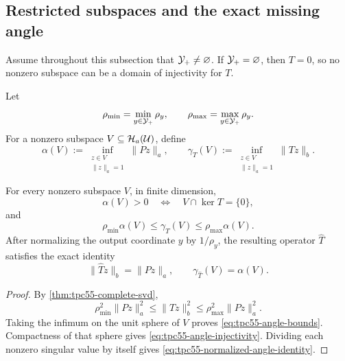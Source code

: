 \subsection{Restricted subspaces and the exact missing angle}

Assume throughout this subsection that \(\mathcal Y_+\ne\varnothing\).  If
\(\mathcal Y_+=\varnothing\), then \(T=0\), so no nonzero subspace can be a domain
of injectivity for \(T\).

Let
\begin{equation}
 \rho_{\min}=\min_{y\in\mathcal Y_+}\rho_y,
 \qquad
 \rho_{\max}=\max_{y\in\mathcal Y_+}\rho_y.
 \label{eq:tpc55-rho-extremes}
\end{equation}
For a nonzero subspace \(V\subseteq\mathcal H_a(\mathcal U)\), define
\begin{equation}
 \alpha(V)
 :=\inf_{\substack{z\in V\\\|z\|_a=1}}\|Pz\|_a,
 \qquad
 \gamma_T(V)
 :=\inf_{\substack{z\in V\\\|z\|_a=1}}\|Tz\|_b.
 \label{eq:tpc55-principal-angle}
\end{equation}

\begin{theorem}
\label{thm:tpc55-angle-criterion}
For every nonzero subspace \(V\), in finite dimension,
\begin{equation}
 \alpha(V)>0
 \quad\Longleftrightarrow\quad
 V\cap\ker T=\{0\},
 \label{eq:tpc55-angle-injectivity}
\end{equation}
and
\begin{equation}
 \rho_{\min}\alpha(V)
 \le\gamma_T(V)
 \le\rho_{\max}\alpha(V).
 \label{eq:tpc55-angle-bounds}
\end{equation}
After normalizing the output coordinate \(y\) by \(1/\rho_y\), the
resulting operator \(\widehat T\) satisfies the exact identity
\begin{equation}
 \|\widehat Tz\|_b=\|Pz\|_a,
 \qquad
 \gamma_{\widehat T}(V)=\alpha(V).
 \label{eq:tpc55-normalized-angle-identity}
\end{equation}
\end{theorem}

\begin{proof}
By \cref{thm:tpc55-complete-svd},
\[
 \rho_{\min}^2\|Pz\|_a^2
 \le\|Tz\|_b^2
 \le\rho_{\max}^2\|Pz\|_a^2.
\]
Taking the infimum on the unit sphere of \(V\) proves
\eqref{eq:tpc55-angle-bounds}.  Compactness of that sphere gives
\eqref{eq:tpc55-angle-injectivity}.  Dividing each nonzero singular value
by itself gives \eqref{eq:tpc55-normalized-angle-identity}.
\end{proof}

